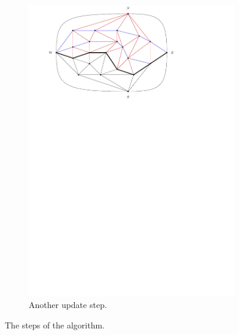 \begin{figure}
    \begin{subfigure}[b]{.9 \textwidth}
      \includegraphics[width=\textwidth]{examples/img/smallExample/smallExample-4}
      \caption{Another update step.}
      \label{fig:ex:simple:4}
    \end{subfigure}
    \caption{The steps of the algorithm.}
\end{figure}

